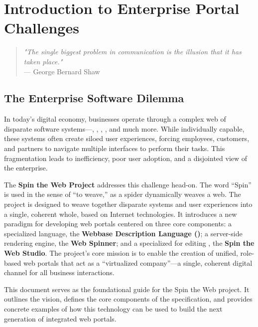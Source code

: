 
\chapter{Introduction to Enterprise Portal Challenges}
\label{chap:intro}

\begin{quote}
\textit{"The single biggest problem in communication is the illusion that it has taken place."} \\
— George Bernard Shaw
\end{quote}

\section{The Enterprise Software Dilemma}
\label{sec:enterprise-dilemma}

In today's digital economy, businesses operate through a complex web of disparate software systems—, , , , and much more. While individually capable, these systems often create siloed user experiences, forcing employees, customers, and partners to navigate multiple interfaces to perform their tasks. This fragmentation leads to inefficiency, poor user adoption, and a disjointed view of the enterprise.

The \textbf{Spin the Web Project} addresses this challenge head-on. The word ``Spin'' is used in the sense of ``to weave,'' as a spider dynamically weaves a web. The project is designed to weave together disparate systems and user experiences into a single, coherent whole, based on Internet technologies. It introduces a new paradigm for developing web portals centered on three core components: a specialized language, the \textbf{Webbase Description Language (\wbdl{})}; a server-side rendering engine, the \textbf{Web Spinner}; and a specialized \webbaselet{} for editing , the \textbf{Spin the Web Studio}. The project's core mission is to enable the creation of unified, role-based web portals that act as a ``virtualized company''—a single, coherent digital channel for all business interactions.

This document serves as the foundational guide for the Spin the Web project. It outlines the vision, defines the core components of the \wbdl{} specification, and provides concrete examples of how this technology can be used to build the next generation of integrated web portals.

